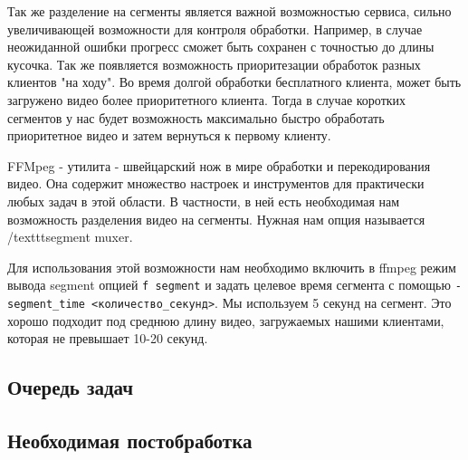 Так же разделение на сегменты является важной возможностью сервиса, сильно увеличивающей возможности для контроля обработки. Например, в случае неожиданной ошибки прогресс сможет быть сохранен с точностью до длины кусочка. Так же появляется возможность приоритезации обработок разных клиентов "на ходу". Во время долгой обработки бесплатного клиента, может быть загружено видео более приоритетного клиента. Тогда в случае коротких сегментов у нас будет возможность максимально быстро обработать приоритетное видео и затем вернуться к первому клиенту.

FFMpeg - утилита - швейцарский нож в мире обработки и перекодирования видео. Она содержит множество настроек и инструментов для практически любых задач в этой области. В частности, в ней есть необходимая нам возможность разделения видео на сегменты. Нужная нам опция называется /texttt{segment muxer}.

Для использования этой возможности нам необходимо включить в ffmpeg режим вывода segment опцией \texttt{\-f segment} и задать целевое время сегмента с помощью \texttt{-segment\_time <количество\_секунд>}. Мы используем 5 секунд на сегмент. Это хорошо подходит под среднюю длину видео, загружаемых нашими клиентами, которая не превышает 10-20 секунд.

\subsection{Очередь задач}

\subsection{Необходимая постобработка}